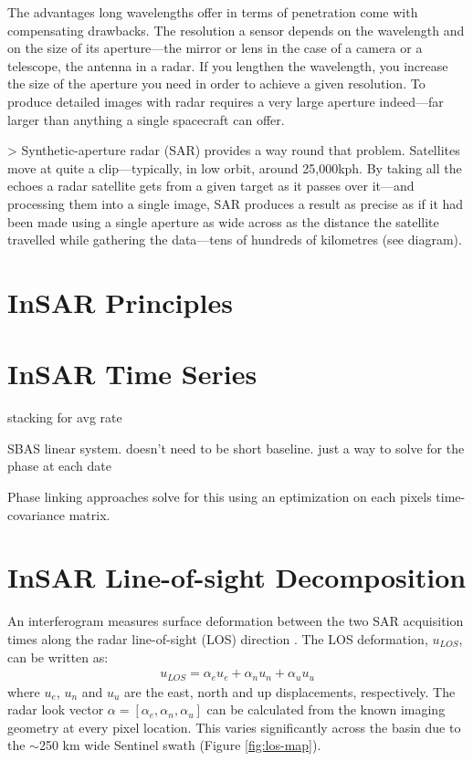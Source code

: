 \documentclass{utexasthesis}
\begin{document}
The advantages long wavelengths offer in terms of penetration come with compensating drawbacks. The resolution a sensor depends on the wavelength and on the size of its aperture—the mirror or lens in the case of a camera or a telescope, the antenna in a radar. If you lengthen the wavelength, you increase the size of the aperture you need in order to achieve a given resolution. To produce detailed images with radar requires a very large aperture indeed—far larger than anything a single spacecraft can offer.

> Synthetic-aperture radar (SAR) provides a way round that problem. Satellites move at quite a clip—typically, in low orbit, around 25,000kph. By taking all the echoes a radar satellite gets from a given target as it passes over it—and processing them into a single image, SAR produces a result as precise as if it had been made using a single aperture as wide across as the distance the satellite travelled while gathering the data—tens of hundreds of kilometres (see diagram).




\section{InSAR Principles}

\section{InSAR Time Series}

stacking for avg rate

SBAS linear system. doesn't need to be short baseline. just a way to solve for the phase at each date

Phase linking approaches solve for this using an eptimization on each pixels time-covariance matrix.


\section{InSAR Line-of-sight Decomposition}
An interferogram measures surface deformation between the two SAR acquisition times along the radar line-of-sight (LOS) direction \citep{Hanssen2001RadarInterferometryData}. The LOS deformation, $u_{LOS}$, can be written as: 
\begin{align}
	u_{LOS}= \alpha_{e} u_{e} + \alpha_{n} u_{n} + \alpha_{u} u_{u}
\end{align}
where $u_{e}$, $u_{n}$ and $u_{u}$ are the east, north and up displacements, respectively. The radar look vector $\alpha = [\alpha_e, \alpha_n, \alpha_u]$ can be calculated from the known imaging geometry at every pixel location. This varies significantly across the basin due to the $ \sim$250 km wide Sentinel swath (Figure \ref{fig:los-map}). 
\end{document}
